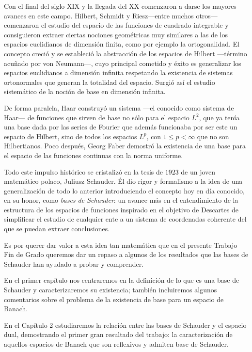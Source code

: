	Con el final del siglo XIX y la llegada del XX comenzaron a darse los mayores avances en este campo. Hilbert, Schmidt y Riesz---entre muchos otros--- comenzaron el estudio del espacio de las funciones de cuadrado integrable y consiguieron extraer ciertas nociones geométricas muy similares a las de los espacios euclidianos de dimensión finita, como por ejemplo la ortogonalidad. El concepto creció y se estableció la abstracción de los espacios de Hilbert ---término acuñado por von Neumann---, cuyo principal cometido y éxito es generalizar los espacios euclidianos a dimensión infinita respetando la existencia de sistemas ortonormales que generan la totalidad del espacio. Surgió así el estudio sistemático de la noción de base en dimensión infinita. 
	
	De forma paralela, Haar construyó un sistema ---el conocido como sistema de Haar--- de funciones que sirven de base no sólo para el espacio $L^2$, que ya tenía una base dada por las series de Fourier que además funcionaba por ser este un espacio de Hilbert, sino de todos los espacios $L^p$, con $1\leq p<\infty$ que  no son Hilbertianos. Poco después, Georg Faber demostró la existencia de una base para el espacio de las funciones continuas con la norma uniforme. 
	
	Todo este impulso histórico se cristalizó en la tesis de $1923$ de un joven matemático polaco, Juliusz Schauder. Él dio rigor y formalismo a la idea de una generalización de todo lo anterior introduciendo el concepto hoy en día conocido, en su honor, como \emph{bases de Schauder}: un avance más en el entendimiento de la estructura de los espacios de funciones inspirado en el objetivo de Descartes de simplificar el estudio de cualquier ente a un sistema de coordenadas coherente del que se puedan extraer conclusiones. 
	
	Es por querer dar valor a esta idea tan matemática que en el presente Trabajo Fin de Grado queremos dar un repaso a algunos de los resultados que las bases de Schauder han ayudado a probar y comprender.
	
	En el primer capítulo nos centraremos en la definición de lo que es una base de Schauder y caracterizaremos su existencia; también incluiremos algunos comentarios sobre el problema de la existencia de base para un espacio de Banach.
	
	En el Capítulo 2 estudiaremos la relación entre las bases de Schauder y el espacio dual, demostrando el primer gran resultado del trabajo: la caracterización de aquellos espacios de Banach que son reflexivos y admiten base de Schauder.
	
